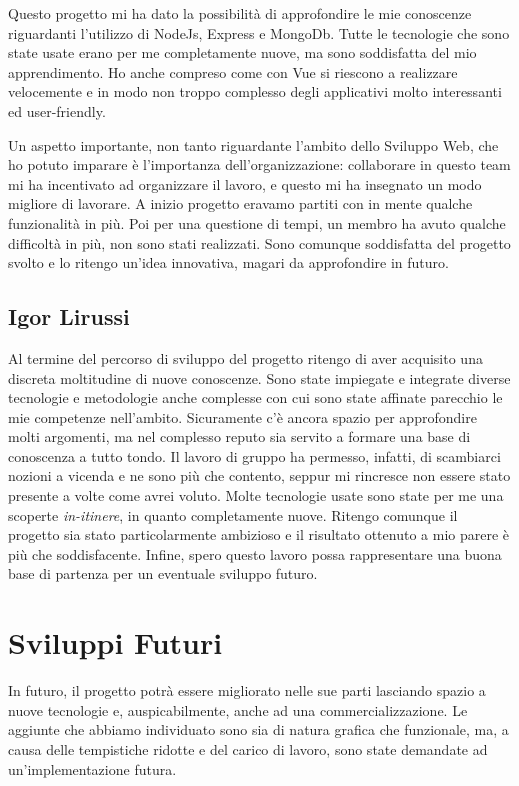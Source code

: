         Questo progetto mi ha dato la possibilità di approfondire le mie conoscenze riguardanti l’utilizzo di NodeJs, Express e MongoDb. Tutte le tecnologie che sono state usate erano per me completamente nuove, ma sono soddisfatta del mio apprendimento. Ho anche compreso come con Vue si riescono a realizzare velocemente e in modo non troppo complesso degli applicativi molto interessanti ed user-friendly. 
        
        Un aspetto importante, non tanto riguardante l’ambito dello Sviluppo Web, che ho potuto imparare è l’importanza dell’organizzazione: collaborare in questo team mi ha incentivato ad organizzare il lavoro, e questo mi ha insegnato un modo migliore di lavorare. A inizio progetto eravamo partiti con in mente qualche funzionalità in più. Poi per una questione di tempi, un membro ha avuto qualche difficoltà in più, non sono stati realizzati.
                Sono comunque soddisfatta del progetto svolto e lo ritengo un'idea innovativa, magari da approfondire in futuro. 

        \subsection{Igor Lirussi}
        
        Al termine del percorso di sviluppo del progetto ritengo di aver acquisito una discreta moltitudine di nuove conoscenze. Sono state impiegate e integrate diverse tecnologie e metodologie anche complesse con cui sono state affinate parecchio le mie competenze nell'ambito. Sicuramente c'è ancora spazio per approfondire molti argomenti, ma nel complesso reputo sia servito a formare una base di conoscenza a tutto tondo. Il lavoro di gruppo ha permesso, infatti, di scambiarci nozioni a vicenda e ne sono più che contento, seppur mi rincresce non essere stato presente a volte come avrei voluto. Molte tecnologie usate sono state per me una scoperte \emph{in-itinere}, in quanto completamente nuove. Ritengo comunque il progetto sia stato particolarmente ambizioso e il risultato ottenuto a mio parere è più che soddisfacente. Infine, spero questo lavoro possa rappresentare una buona base di partenza per un eventuale sviluppo futuro. 
    
    \section{Sviluppi Futuri}
    
    In futuro, il progetto potrà essere migliorato nelle sue parti lasciando spazio a nuove tecnologie e, auspicabilmente, anche ad una commercializzazione. 
    Le aggiunte che abbiamo individuato sono sia di natura grafica che funzionale, ma, a causa delle tempistiche ridotte e del carico di lavoro, sono state demandate ad un'implementazione futura.
    
